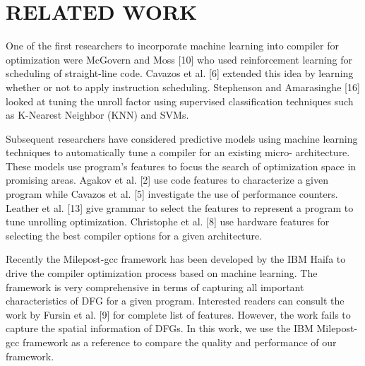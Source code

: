 \documentclass[conference]{IEEEtran}
\begin{document}
\section{RELATED WORK}
One of the first researchers to incorporate machine learning into compiler for optimization were McGovern and Moss [10] who used reinforcement learning for scheduling of straight-line code. Cavazos et al. [6] extended this idea by learning whether or not to apply instruction scheduling. Stephenson
and Amarasinghe [16] looked at tuning the unroll factor using supervised classification techniques such as K-Nearest Neighbor (KNN) and SVMs.\par

Subsequent researchers have considered predictive models using machine learning techniques to automatically tune a compiler for an existing micro- architecture. These models use program’s features to focus the search of optimization space in promising areas. Agakov et al. [2] use code features to characterize a given program while Cavazos et al. [5] investigate the use of performance counters. Leather et al. [13] give grammar to select the features to represent a program to tune unrolling optimization. Christophe et al. [8] use hardware features for selecting the best compiler 
options for a given architecture.\par

Recently the Milepost-gcc framework has been developed by the IBM Haifa to drive the compiler optimization process based on machine learning. The framework is very comprehensive in terms of capturing all important characteristics of DFG for a given program. Interested readers can consult
the work by Fursin et al. [9] for complete list of features. However, the work fails to capture the spatial information of DFGs. In this work, we use the IBM Milepost-gcc framework as a reference to compare the quality and performance of our framework.
\end{document}
